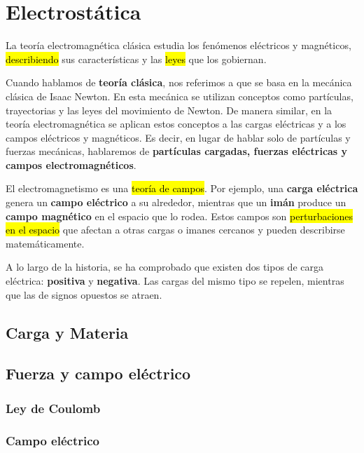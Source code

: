 \section{Electrostática}

La teoría electromagnética clásica estudia los fenómenos eléctricos y magnéticos, \hl{describiendo} sus características y las \hl{leyes} que los gobiernan.  

Cuando hablamos de \textbf{teoría clásica}, nos referimos a que se basa en la mecánica clásica de Isaac Newton. En esta mecánica se utilizan conceptos como partículas, trayectorias y las leyes del movimiento de Newton. De manera similar, en la teoría electromagnética se aplican estos conceptos a las cargas eléctricas y a los campos eléctricos y magnéticos. Es decir, en lugar de hablar solo de partículas y fuerzas mecánicas, hablaremos de \textbf{partículas cargadas, fuerzas eléctricas y campos electromagnéticos}.  

El electromagnetismo es una \hl{teoría de campos}. Por ejemplo, una \textbf{carga eléctrica} genera un \textbf{campo eléctrico} a su alrededor, mientras que un \textbf{imán} produce un \textbf{campo magnético} en el espacio que lo rodea. Estos campos son \hl{perturbaciones en el espacio} que afectan a otras cargas o imanes cercanos y pueden describirse matemáticamente.  

A lo largo de la historia, se ha comprobado que existen dos tipos de carga eléctrica: \textbf{positiva} y \textbf{negativa}. Las cargas del mismo tipo se repelen, mientras que las de signos opuestos se atraen.  

\subsection{Carga y Materia}



\subsection{Fuerza y campo eléctrico}

\subsubsection{Ley de Coulomb}



\subsubsection{Campo eléctrico}

